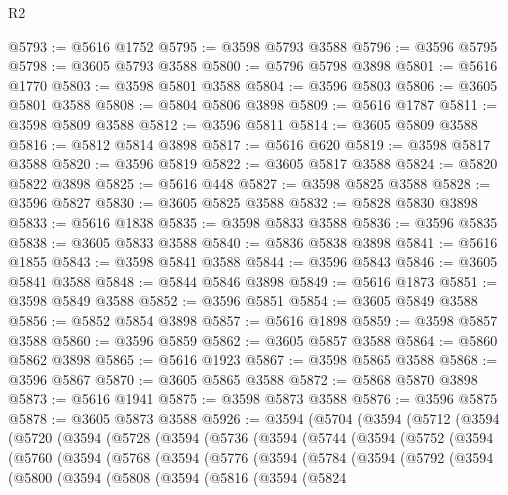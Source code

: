 \begin{lexlean}{R2}
\begin{coremodule}
@5793 := @5616 @1752
@5795 := @3598 @5793 @3588
@5796 := @3596 @5795
@5798 := @3605 @5793 @3588
@5800 := @5796 @5798 @3898
@5801 := @5616 @1770
@5803 := @3598 @5801 @3588
@5804 := @3596 @5803
@5806 := @3605 @5801 @3588
@5808 := @5804 @5806 @3898
@5809 := @5616 @1787
@5811 := @3598 @5809 @3588
@5812 := @3596 @5811
@5814 := @3605 @5809 @3588
@5816 := @5812 @5814 @3898
@5817 := @5616 @620
@5819 := @3598 @5817 @3588
@5820 := @3596 @5819
@5822 := @3605 @5817 @3588
@5824 := @5820 @5822 @3898
@5825 := @5616 @448
@5827 := @3598 @5825 @3588
@5828 := @3596 @5827
@5830 := @3605 @5825 @3588
@5832 := @5828 @5830 @3898
@5833 := @5616 @1838
@5835 := @3598 @5833 @3588
@5836 := @3596 @5835
@5838 := @3605 @5833 @3588
@5840 := @5836 @5838 @3898
@5841 := @5616 @1855
@5843 := @3598 @5841 @3588
@5844 := @3596 @5843
@5846 := @3605 @5841 @3588
@5848 := @5844 @5846 @3898
@5849 := @5616 @1873
@5851 := @3598 @5849 @3588
@5852 := @3596 @5851
@5854 := @3605 @5849 @3588
@5856 := @5852 @5854 @3898
@5857 := @5616 @1898
@5859 := @3598 @5857 @3588
@5860 := @3596 @5859
@5862 := @3605 @5857 @3588
@5864 := @5860 @5862 @3898
@5865 := @5616 @1923
@5867 := @3598 @5865 @3588
@5868 := @3596 @5867
@5870 := @3605 @5865 @3588
@5872 := @5868 @5870 @3898
@5873 := @5616 @1941
@5875 := @3598 @5873 @3588
@5876 := @3596 @5875
@5878 := @3605 @5873 @3588
@5926 := @3594
    (@5704
      (@3594
        (@5712
          (@3594
            (@5720
              (@3594
                (@5728
                  (@3594
                    (@5736
                      (@3594
                        (@5744
                          (@3594
                            (@5752
                              (@3594
                                (@5760
                                  (@3594
                                    (@5768
                                      (@3594
                                        (@5776
                                          (@3594
                                            (@5784
                                              (@3594
                                                (@5792
                                                  (@3594
                                                    (@5800
                                                      (@3594
                                                        (@5808
                                                          (@3594
                                                            (@5816
                                                              (@3594
                                                                (@5824

\end{coremodule}
\end{lexlean}
